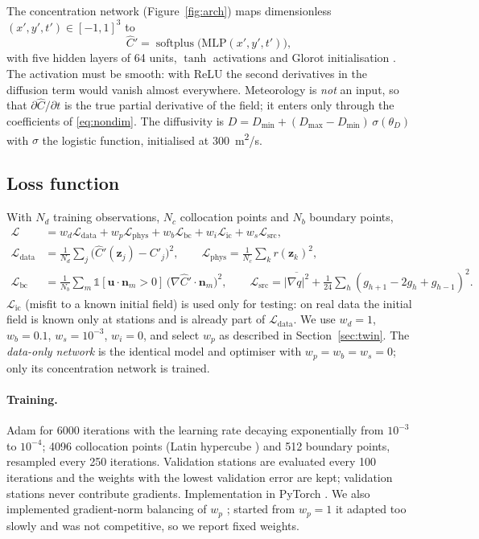 \documentclass[11pt,a4paper]{article}
\begin{document}
The concentration network (Figure~\ref{fig:arch}) maps dimensionless $(x',y',t')\in[-1,1]^3$ to
\[
\hat C'=\operatorname{softplus}\bigl(\mathrm{MLP}(x',y',t')\bigr),
\]
with five hidden layers of 64 units, $\tanh$ activations and Glorot initialisation \citep{glorot2010}. The activation must be smooth: with ReLU the second derivatives
in the diffusion term would vanish almost everywhere. Meteorology is \emph{not} an input, so that
$\partial\hat C/\partial t$ is the true partial derivative of the field; it enters only through the coefficients of
\eqref{eq:nondim}. The diffusivity is $D=D_{\min}+(D_{\max}-D_{\min})\,\sigma(\theta_D)$ with $\sigma$ the logistic
function, initialised at \SI{300}{m^2/s}.

\subsection{Loss function}
With $N_d$ training observations, $N_c$ collocation points and $N_b$ boundary points,
\begin{align}
\mathcal L &= w_d\mathcal L_{\mathrm{data}} + w_p\mathcal L_{\mathrm{phys}} + w_b\mathcal L_{\mathrm{bc}}
+ w_i\mathcal L_{\mathrm{ic}} + w_s\mathcal L_{\mathrm{src}},\\
\mathcal L_{\mathrm{data}} &= \frac1{N_d}\sum_{j}\bigl(\hat C'(\bm z_j)-C'_j\bigr)^2,\qquad
\mathcal L_{\mathrm{phys}} = \frac1{N_c}\sum_{k} r(\bm z_k)^2,\\
\mathcal L_{\mathrm{bc}} &= \frac1{N_b}\sum_{m}\mathbb 1[\bm u\cdot\bm n_m>0]\,\bigl(\nabla\hat C'\cdot\bm n_m\bigr)^2,\qquad
\mathcal L_{\mathrm{src}} = \overline{|\nabla q|^2} + \tfrac1{24}\textstyle\sum_h (g_{h+1}-2g_h+g_{h-1})^2 .
\end{align}
$\mathcal L_{\mathrm{ic}}$ (misfit to a known initial field) is used only for testing: on real data the initial
field is known only at stations and is already part of $\mathcal L_{\mathrm{data}}$. We use $w_d=1$, $w_b=0.1$,
$w_s=10^{-3}$, $w_i=0$, and select $w_p$ as described in Section~\ref{sec:twin}. The \emph{data-only network} is
the identical model and optimiser with $w_p=w_b=w_s=0$; only its concentration network is trained.

\paragraph{Training.} Adam \citep{kingma2015} for 6000 iterations with the learning rate decaying exponentially from
$10^{-3}$ to $10^{-4}$; 4096 collocation points (Latin hypercube \citep{mckay1979}) and 512 boundary points,
resampled every 250 iterations. Validation stations are evaluated every 100 iterations and the weights with the
lowest validation error are kept; validation stations never contribute gradients. Implementation in PyTorch
\citep{paszke2019}. We also implemented gradient-norm balancing of $w_p$ \citep{wang2021}; started from $w_p=1$ it
adapted too slowly and was not competitive, so we report fixed weights.
\end{document}
